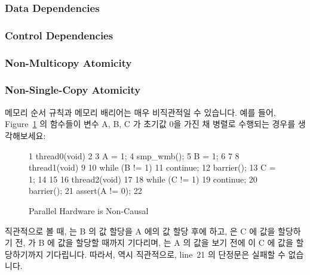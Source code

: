 \subsubsection{Data Dependencies}
\label{sec:advsync:Data Reordering}


\subsubsection{Control Dependencies}
\label{sec:advsync:Control Dependencies}

\subsubsection{Non-Multicopy Atomicity}
\label{sec:advsync:Non-Multicopy Atomicity}

\subsubsection{Non-Single-Copy Atomicity}
\label{sec:advsync:Non-Single-Copy Atomicity}

메모리 순서 규칙과 메모리 배리어는 매우 비직관적일 수 있습니다.
예를 들어, Figure~\ref{fig:advsync:Parallel Hardware is Non-Causal} 의 함수들이
변수 A, B, C 가 초기값 0을 가진 채 병렬로 수행되는 경우를 생각해보세요:

\begin{figure}[htbp]
{ \scriptsize
\begin{verbbox}
  1 thread0(void)
  2 {
  3   A = 1;
  4   smp_wmb();
  5   B = 1;
  6 }
  7
  8 thread1(void)
  9 {
 10   while (B != 1)
 11     continue;
 12   barrier();
 13   C = 1;
 14 }
 15
 16 thread2(void)
 17 {
 18   while (C != 1)
 19     continue;
 20   barrier();
 21   assert(A != 0);
 22 }
\end{verbbox}
}
\centering
\theverbbox
\caption{Parallel Hardware is Non-Causal}
\label{fig:advsync:Parallel Hardware is Non-Causal}
\end{figure}

직관적으로 볼 때,  는 B 의 값 할당을 A 에의 값 할당 후에 하고,
 은 C 에 값을 할당하기 전,  가 B 에 값을 할당할
때까지 기다리며,  는 A 의 값을 보기 전에  이 C 에
값을 할당하기까지 기다립니다.
따라서, 역시 직관적으로, line~21 의 단정문은 실패할 수 없습니다.
\iffalse

